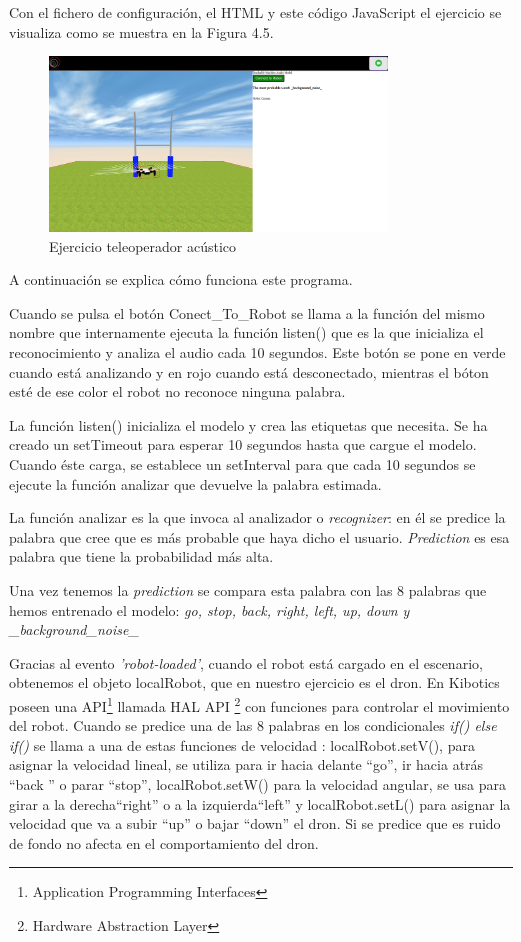 Con el fichero de configuración, el HTML y este código JavaScript el ejercicio se visualiza como se muestra en la Figura 4.5.

\begin{figure}[H]
    \centering
    \includegraphics[width=0.8\textwidth, height=0.4\textwidth]{chapters/images/audio.png}
    \caption{Ejercicio teleoperador acústico}
    \label{fig:my_label}
\end{figure}

A continuación se explica cómo funciona este programa.

Cuando se pulsa el botón Conect\_To\_Robot se llama a la función del mismo nombre que internamente ejecuta  la función listen() que es la que inicializa el reconocimiento y analiza el audio cada 10 segundos.
Este botón se pone en verde cuando está analizando y en rojo cuando está desconectado, mientras el bóton esté de ese color el robot no reconoce ninguna palabra.

La función listen() inicializa el modelo y crea las etiquetas que necesita. Se ha creado un setTimeout para esperar 10 segundos hasta que cargue el modelo. Cuando éste carga, se establece un setInterval para que cada 10 segundos se ejecute la función analizar que devuelve la palabra estimada.

La función analizar es la que invoca al analizador o \textit{recognizer}: en él se predice la palabra que cree que es más probable que haya dicho el usuario.  \textit{Prediction} es esa palabra que tiene  la probabilidad más alta.

Una vez tenemos la \textit{prediction} se compara esta palabra con las 8 palabras que hemos entrenado el modelo: \textit{go, stop, back, right, left, up, down y \_background\_noise\_}

Gracias al evento \textit{'robot-loaded'}, cuando el robot está cargado en el escenario, obtenemos el objeto localRobot, que en nuestro ejercicio es el dron. En Kibotics poseen una API\footnote{Application Programming Interfaces} llamada HAL API \footnote{Hardware Abstraction Layer} con funciones para controlar el movimiento del robot.  Cuando se predice una de las 8 palabras en los condicionales \textit{if(){} else if() {}}se llama a una de estas funciones de velocidad : localRobot.setV(), para asignar la velocidad lineal, se utiliza para ir hacia delante ``go'', ir hacia atrás ``back '' o parar ``stop'',  localRobot.setW() para la velocidad angular, se usa para girar a la derecha``right'' o a la izquierda``left'' y  localRobot.setL() para asignar la velocidad que va a subir ``up'' o bajar ``down'' el dron. Si se predice que es ruido de fondo no afecta en el comportamiento del dron.

